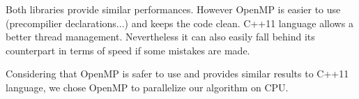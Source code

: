 Both libraries provide similar performances\cite{OpenMP_vs_CC}. However OpenMP is easier to use (precompilier declarations...) and keeps the code clean\cite{OpenMp_vs_explicit_threading}. C++11 language allows a better thread management. Nevertheless it can also easily fall behind its counterpart in terms of speed if some mistakes are made.

Considering that OpenMP is safer to use and provides similar results to C++11 language, we chose OpenMP to parallelize our algorithm on CPU.